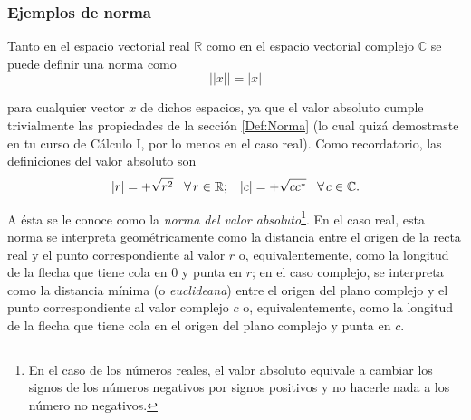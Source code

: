 \documentclass[12pt]{article}
\begin{document}
\subsubsection{Ejemplos de norma}

Tanto en el espacio vectorial real $\mathbb{R}$ como en el espacio vectorial complejo $\mathbb{C}$ se puede definir una norma como $$||x|| = |x|$$

\noindent para cualquier vector $x$ de dichos espacios, ya que el valor absoluto cumple trivialmente las propiedades de la sección \ref{Def:Norma} (lo cual quizá demostraste en tu curso de Cálculo I, por lo menos en el caso real). Como recordatorio, las definiciones del valor absoluto son $$|r| = +\sqrt{r^2} \hspace{3mm}\forall\hspace{0.5mm}r\in\mathbb{
R}; \hspace{3mm} |c| = +\sqrt{cc^*}\hspace{3mm}\forall\hspace{0.5mm}c\in\mathbb{C}.$$

\noindent A ésta se le conoce como la \emph{norma del valor absoluto}\footnote{En el caso de los números reales, el valor absoluto equivale a cambiar los signos de los números negativos por signos positivos y no hacerle nada a los número no negativos.}. En el caso real, esta norma se interpreta geométricamente como la distancia entre el origen de la recta real y el punto correspondiente al valor $r$ o, equivalentemente, como la longitud de la flecha que tiene cola en $0$ y punta en $r$; en el caso complejo, se interpreta como la distancia mínima (o \emph{euclideana}) entre el origen del plano complejo y el punto correspondiente al valor complejo $c$ o, equivalentemente, como la longitud de la flecha que tiene cola en el origen del plano complejo y punta en $c$. 

\begin{comment}

\begin{figure}
    \centering
    \texttt{[image: ]}
    \caption{Caption}
    \label{fig:my_label}
\end{figure}

\end{comment}

\vspace{3mm}
\end{document}
